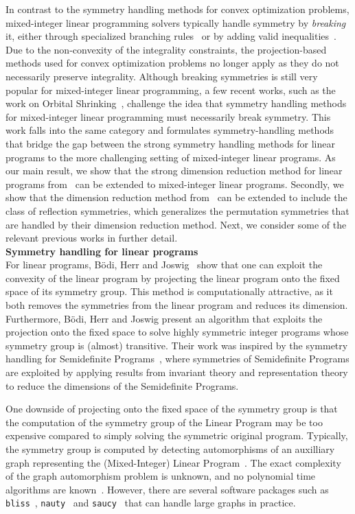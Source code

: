 \documentclass[pdflatex,sn-mathphys-num]{sn-jnl}%
\theoremstyle{thmstyleone}%
\theoremstyle{thmstylethree}%
\theoremstyle{thmstyletwo}%
\begin{document}
In contrast to the symmetry handling methods for convex optimization problems, mixed-integer linear programming solvers typically handle symmetry by \emph{breaking} it, either through specialized branching rules~\cite{Ostrowski2011} or by adding valid inequalities~\cite{Liberti2012}. Due to the non-convexity of the integrality constraints, the projection-based methods used for convex optimization problems no longer apply as they do not necessarily preserve integrality. Although breaking symmetries is still very popular for mixed-integer linear programming, a few recent works, such as the work on Orbital Shrinking~\cite{Fischetti2012,Salvagnin2013, Fischetti2017}, challenge the idea that symmetry handling methods for mixed-integer linear programming must necessarily break symmetry. This work falls into the same category and formulates symmetry-handling methods that bridge the gap between the strong symmetry handling methods for linear programs to the more challenging setting of mixed-integer linear programs. As our main result, we show that the strong dimension reduction method for linear programs from~\cite{Grohe2014} can be extended to mixed-integer linear programs. Secondly, we show that the dimension reduction method from~\cite{Grohe2014} can be extended to include the class of reflection symmetries, which generalizes the permutation symmetries that are handled by their dimension reduction method.
Next, we consider some of the relevant previous works in further detail.\\

\noindent\textbf{Symmetry handling for linear programs}\\
For linear programs, B{\"o}di, Herr and Joswig~\cite{Bodi2013} show that one can exploit the convexity of the linear program by projecting the linear program onto the fixed space of its symmetry group. This method is computationally attractive, as it both removes the symmetries from the linear program and reduces its dimension. Furthermore, B{\"o}di, Herr and Joswig present an algorithm that exploits the projection onto the fixed space to solve highly symmetric integer programs whose symmetry group is (almost) transitive.
Their work was inspired by the symmetry handling for Semidefinite Programs~\cite{Gatermann2004,Bachoc2012,Permenter2020}, where symmetries of Semidefinite Programs are exploited by applying results from invariant theory and representation theory to reduce the dimensions of the Semidefinite Programs. 

One downside of projecting onto the fixed space of the symmetry group is that the computation of the symmetry group of the Linear Program may be too expensive compared to simply solving the symmetric original program. Typically, the symmetry group is computed by detecting automorphisms of an auxilliary graph representing the (Mixed-Integer) Linear Program~\cite{Margot2010}. The exact complexity of the graph automorphism problem is unknown, and no polynomial time algorithms are known~\cite{Read1977}. However, there are several software packages such as \texttt{bliss}~\cite{Junttila}, \texttt{nauty}~\cite{McKay2025} and \texttt{saucy}~\cite{Darga} that can handle large graphs in practice. \\
\end{document}
